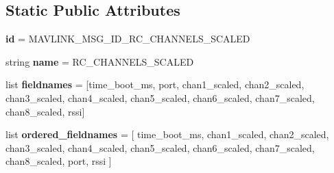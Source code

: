 \subsection*{Static Public Attributes}
\begin{DoxyCompactItemize}
\item 
\mbox{\label{classpymavlink_1_1dialects_1_1v10_1_1MAVLink__rc__channels__scaled__message_aed470e72e474eeed5a5e0c3e68aa54e2}} 
{\bfseries id} = M\+A\+V\+L\+I\+N\+K\+\_\+\+M\+S\+G\+\_\+\+I\+D\+\_\+\+R\+C\+\_\+\+C\+H\+A\+N\+N\+E\+L\+S\+\_\+\+S\+C\+A\+L\+ED
\item 
\mbox{\label{classpymavlink_1_1dialects_1_1v10_1_1MAVLink__rc__channels__scaled__message_ab40b9246d2e09266e5b3a64f410dba84}} 
string {\bfseries name} = \textquotesingle{}R\+C\+\_\+\+C\+H\+A\+N\+N\+E\+L\+S\+\_\+\+S\+C\+A\+L\+ED\textquotesingle{}
\item 
\mbox{\label{classpymavlink_1_1dialects_1_1v10_1_1MAVLink__rc__channels__scaled__message_a366c8b4d9a096f2dc203dd62aa7d1e48}} 
list {\bfseries fieldnames} = \mbox{[}\textquotesingle{}time\+\_\+boot\+\_\+ms\textquotesingle{}, \textquotesingle{}port\textquotesingle{}, \textquotesingle{}chan1\+\_\+scaled\textquotesingle{}, \textquotesingle{}chan2\+\_\+scaled\textquotesingle{}, \textquotesingle{}chan3\+\_\+scaled\textquotesingle{}, \textquotesingle{}chan4\+\_\+scaled\textquotesingle{}, \textquotesingle{}chan5\+\_\+scaled\textquotesingle{}, \textquotesingle{}chan6\+\_\+scaled\textquotesingle{}, \textquotesingle{}chan7\+\_\+scaled\textquotesingle{}, \textquotesingle{}chan8\+\_\+scaled\textquotesingle{}, \textquotesingle{}rssi\textquotesingle{}\mbox{]}
\item 
\mbox{\label{classpymavlink_1_1dialects_1_1v10_1_1MAVLink__rc__channels__scaled__message_ae8dc9cb45446eb65feb2bf76005a7bff}} 
list {\bfseries ordered\+\_\+fieldnames} = \mbox{[} \textquotesingle{}time\+\_\+boot\+\_\+ms\textquotesingle{}, \textquotesingle{}chan1\+\_\+scaled\textquotesingle{}, \textquotesingle{}chan2\+\_\+scaled\textquotesingle{}, \textquotesingle{}chan3\+\_\+scaled\textquotesingle{}, \textquotesingle{}chan4\+\_\+scaled\textquotesingle{}, \textquotesingle{}chan5\+\_\+scaled\textquotesingle{}, \textquotesingle{}chan6\+\_\+scaled\textquotesingle{}, \textquotesingle{}chan7\+\_\+scaled\textquotesingle{}, \textquotesingle{}chan8\+\_\+scaled\textquotesingle{}, \textquotesingle{}port\textquotesingle{}, \textquotesingle{}rssi\textquotesingle{} \mbox{]}

\end{DoxyCompactItemize}
